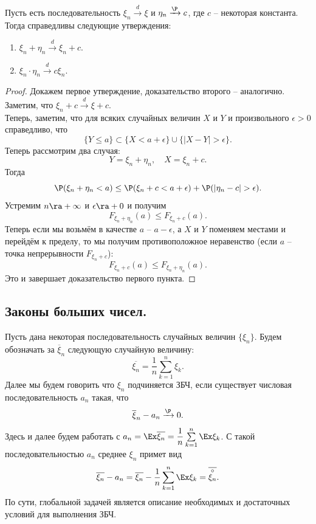 \begin{theorem}[Слуцкий]
    Пусть есть последовательность $\xi_n \xrightarrow{d} \xi$ и $\eta_n \xrightarrow{\P} c$, где $c$ -- некоторая константа.
    Тогда справедливы следующие утверждения:
    \begin{enumerate}
        \item $\xi_n + \eta_n \xrightarrow{d} \xi_n + c$.
        \item $\xi_n \cdot \eta_n \xrightarrow{d} c\xi_n$.
    \end{enumerate}
\end{theorem}
\begin{proof}
    Докажем первое утверждение, доказательство второго -- аналогично. \\
    Заметим, что $\xi_n + c \xrightarrow{d} \xi + c$. \\
    Теперь, заметим, что для всяких случайных величин $X$ и $Y$ и произвольного $\epsilon > 0$ справедливо, что
    \[
        \{Y \leq a\} \subset \{X < a + \epsilon\} \cup \{ |X - Y| > \epsilon \}.
    \]
    Теперь рассмотрим два случая:
    \[
        Y = \xi_n + \eta_n, \quad X = \xi_n + c.
    \]
    Тогда
    \[
        \P(\xi_n + \eta_n < a) \leq \P(\xi_n + c < a + \epsilon) + \P(|\eta_n - c| > \epsilon).
    \]
    Устремим $n \ra +\infty$ и $\epsilon \ra +0$ и получим
    \[
        F_{\xi_n + \eta_n}(a) \leq F_{\xi_n + c}(a).
    \]
    Теперь если мы возьмём в качестве $a$ -- $a - \epsilon$, а $X$ и $Y$ поменяем местами и перейдём к пределу, то мы получим противоположное неравенство (если $a$ -- точка непрерывности $F_{\xi_n + c}$):
    \[
        F_{\xi_n + c}(a) \leq F_{\xi_n + \eta_n}(a).
    \]
    Это и завершает доказательство первого пункта.
\end{proof}
\subsection{Законы больших чисел.}
Пусть дана некоторая последовательность случайных величин $\{\xi_n\}$.
Будем обозначать за $\overline{\xi}_n$ следующую случайную величину:
\[
    \overline{\xi_n} = \dfrac{1}{n}\sum\limits_{k = 1}^{n}\xi_k.
\]
Далее мы будем говорить что $\xi_n$ подчиняется ЗБЧ, если существует числовая последовательность $a_n$ такая, что
\[
    \overline{\xi}_n - a_n \xrightarrow{\P} 0.
\]
Здесь и далее будем работать с $a_n = \Ex \overline{\xi_n} = \dfrac{1}{n}\sum\limits_{k = 1}^n \Ex \xi_k$.
С такой последовательностью $a_n$ среднее $\xi_n$ примет вид
\[
    \overline{\xi_n} - a_n = \overline{\xi_n} - \dfrac{1}{n}\sum\limits_{k = 1}^{n} \Ex \xi_k = \overline{\overset{\circ}{\xi_n}}.
\]
По сути, глобальной задачей является описание необходимых и достаточных условий для выполнения ЗБЧ.
